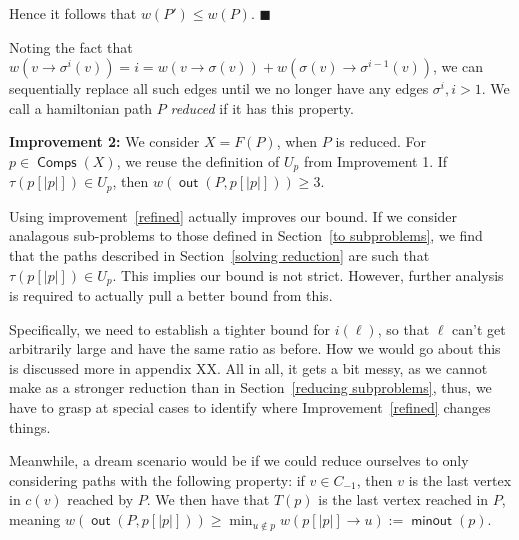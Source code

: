 \documentclass{article}
\DeclareMathOperator{\minout}{\bm{\mathsf{minout}}}
\DeclareMathOperator{\out}{\bm{\mathsf{out}}}
\DeclareMathOperator{\Comp}{\bm{\mathsf{Comps}}}
\newcommand{\hide}[1]{}
\newcommand{\edit}[1]{}%
\begin{document}
Hence it follows that $w(P') \leq w(P)$. $\blacksquare$

Noting the fact that $w(v \to \sigma^i(v)) = i = w(v \to \sigma(v)) + w(\sigma(v)\to \sigma^{i-1}(v))$, we can sequentially replace all such edges until we no longer have any edges $\sigma^i, i > 1$. We call a hamiltonian path $P$ \textit{reduced} if it has this property.\edit{ use the word reduced a lot}

\textbf{Improvement 2:} \label{refined} We consider $X = F(P)$, when $P$ is reduced. For $p \in \Comp(X)$, we reuse the definition of $U_p$ from Improvement 1. If $\tau(p[|p|]) \in U_p$, then $w(\out(P,p[|p|])) \geq 3$.

Using improvement~\ref{refined} actually improves our bound. If we consider analagous sub-problems to those defined in Section~\ref{to subproblems}, we find that the paths described in Section~\ref{solving reduction} are such that $\tau(p[|p|]) \in U_p$. This implies our bound is not strict. However, further analysis is required to actually pull a better bound from this. 

Specifically, we need to establish a tighter bound for $i(\ell)$, so that $\ell$ can't get arbitrarily large and have the same ratio as before. How we would go about this is discussed more in appendix XX.\edit{ insert this in somewhere} All in all, it gets a bit messy, as we cannot make as a stronger reduction than in Section~\ref{reducing subproblems}, thus, we have to grasp at special cases to identify where Improvement~\ref{refined} changes things.\edit{ clarify}

\hide{
Unfortunately, improvement 2 is still not sufficient to improve the lower bound. Solving analagous subproblems to those established in 5.1, we may reuse the solutions provided in 5.3 to get the same bound. (however, we now have that $\ell_1$ now has only one solution, as the larger values now have an additional weight)}

Meanwhile, a dream scenario would be if we could reduce ourselves to only considering paths with the following property: if $v \in C_{-1}$, then $v$ is the last vertex in $c(v)$ reached by $P$. We then have that $T(p)$ is the last vertex reached in $P$, meaning $w(\out(P,p[|p|])) \geq \min_{u\not \in p} w(p[|p|] \to u) := \minout(p)$.
\end{document}
